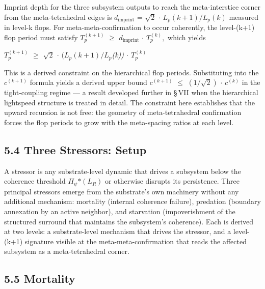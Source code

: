 \documentclass[11pt,oneside]{report}
\theoremstyle{definition}
\theoremstyle{remark}
\begin{document}
Imprint depth for the three subsystem outputs to reach the
meta-interstice corner from the meta-tetrahedral edges is \ensuremath{d_{\mathrm{imprint}}} =
\ensuremath{\sqrt{2}} \ensuremath{\cdot} \ensuremath{L_{p}(k+1)/L_{p}(k)} measured in level-k flops. For
meta-meta-confirmation to occur coherently, the level-(k+1) flop period
must satisfy \ensuremath{T_{p}^{(k+1)}} \ensuremath{\geq} \ensuremath{d_{\mathrm{imprint}}} \ensuremath{\cdot} \ensuremath{T_{p}^{(k)},} which yields

\emph{\ensuremath{T_{p}^{(k+1)}} \ensuremath{\geq} \ensuremath{\sqrt{2}} \ensuremath{\cdot} \ensuremath{(L_{p}}\textbf{\ensuremath{(k+1)/L_{p}}}(k)) \ensuremath{\cdot} \ensuremath{T_{p}^{(k)}}}

This is a derived constraint on the hierarchical flop periods.
Substituting into the \ensuremath{c^{(k+1)}} formula yields a derived upper bound
\ensuremath{c^{(k+1)}} \ensuremath{\leq} \ensuremath{(1/\sqrt{2})} \ensuremath{\cdot} \ensuremath{c^{(k)}} in the tight-coupling regime --- a result
developed further in \S\,VII when the hierarchical lightspeed structure is
treated in detail. The constraint here establishes that the upward
recursion is not free: the geometry of meta-tetrahedral confirmation
forces the flop periods to grow with the meta-spacing ratios at each
level.

\subsection*{5.4 Three Stressors: Setup}

A stressor is any substrate-level dynamic that drives a subsystem below
the coherence threshold \textbar \ensuremath{\Pi_{\psi}}\textbar\ensuremath{*(L_{R})} or otherwise
disrupts its persistence. Three principal stressors emerge from the
substrate's own machinery without any additional mechanism: mortality
(internal coherence failure), predation (boundary annexation by an
active neighbor), and starvation (impoverishment of the structured
surround that maintains the subsystem's coherence). Each is derived at
two levels: a substrate-level mechanism that drives the stressor, and a
level-(k+1) signature visible at the meta-meta-confirmation that reads
the affected subsystem as a meta-tetrahedral corner.

\subsection*{5.5 Mortality}
\end{document}
